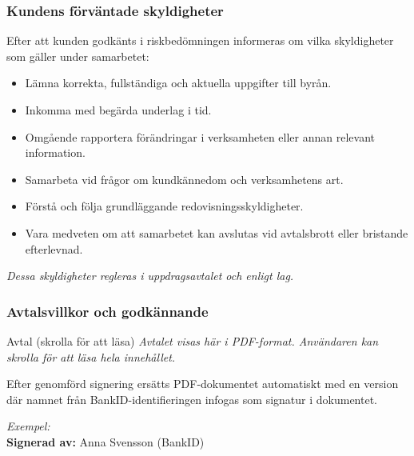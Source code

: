 \documentclass[10pt]{beamer}
\begin{document}
\begin{frame}
  \frametitle{Kundens förväntade skyldigheter}
  \small
  Efter att kunden godkänts i riskbedömningen informeras om vilka skyldigheter som gäller under samarbetet:
  \begin{itemize}
    \item Lämna korrekta, fullständiga och aktuella uppgifter till byrån.
    \item Inkomma med begärda underlag i tid.
    \item Omgående rapportera förändringar i verksamheten eller annan relevant information.
    \item Samarbeta vid frågor om kundkännedom och verksamhetens art.
    \item Förstå och följa grundläggande redovisningsskyldigheter.
    \item Vara medveten om att samarbetet kan avslutas vid avtalsbrott eller bristande efterlevnad.
  \end{itemize}
  \vspace{0.5cm}
  \textit{Dessa skyldigheter regleras i uppdragsavtalet och enligt lag.}
  \vspace{0.8cm}
  \begin{flushright}
  \end{flushright}
\end{frame}

\begin{frame}[fragile]
  \frametitle{Avtalsvillkor och godkännande}

  \begin{block}{Avtal (skrolla för att läsa)}
    \vspace{0.2cm}
    \textit{\footnotesize Avtalet visas här i PDF-format. Användaren kan skrolla för att läsa hela innehållet.}
    \vspace{0.4cm}
  \end{block}

  \vspace{0.4cm}
  \begin{center}
  \end{center}

  \vspace{0.6cm}
  \small
  Efter genomförd signering ersätts PDF-dokumentet automatiskt med en version där
  namnet från BankID-identifieringen infogas som signatur i dokumentet.
  \medskip

  \textit{Exempel:}\\
  \textbf{Signerad av:} Anna Svensson (BankID)

\end{frame}
\end{document}
